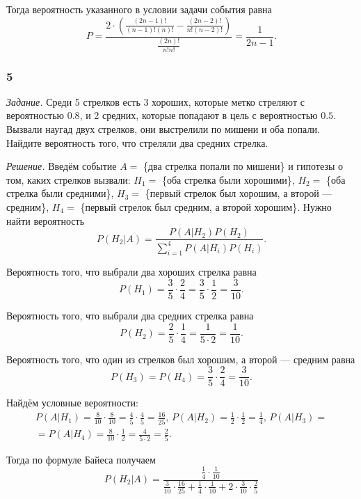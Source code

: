 Тогда вероятность указанного в условии задачи события равна
$$P =
\frac{2 \cdot \left( \frac{ \left( 2n-1 \right)!}{ \left( n-1 \right)! \left( n \right)!} -
\frac{ \left( 2n-2 \right)!}{n! \left( n-2 \right)!} \right) }{\frac{ \left( 2n \right)!}{n!n!}} =
\frac{1}{2n-1}.$$

\subsubsection*{5}

\textit{Задание.}
Среди 5 стрелков есть 3 хороших, которые метко стреляют с вероятностью $0.8$, и 2 средних, которые попадают в цель с вероятностью $0.5$.
Вызвали наугад двух стрелков, они выстрелили по мишени и оба попали.
Найдите вероятность того, что стреляли два средних стрелка.

\textit{Решение.}
Введём событие $A =$ \{два стрелка попали по мишени\} и гипотезы о том,
каких стрелков вызвали: $H_1 =$ \{оба стрелка были хорошими\},
$H_2 =$ \{оба стрелка были средними\}, $H_3 =$ \{первый стрелок был хорошим, а второй --- средним\}, $H_4 =$ \{первый стрелок был средним, а второй хорошим\}.
Нужно найти вероятность
$$P \left( \left. H_2 \right| A \right) =
\frac{P \left( \left. A \right| H_2 \right) P \left( H_2 \right) }{ \sum \limits_{i=1}^4 P \left( \left. A \right| H_i \right) P \left( H_i \right) }.$$

Вероятность того, что выбрали два хороших стрелка равна
$$P \left( H_1 \right) =
\frac{3}{5} \cdot \frac{2}{4} =
\frac{3}{5} \cdot \frac{1}{2} =
\frac{3}{10}.$$

Вероятность того, что выбрали два средних стрелка равна
$$P \left( H_2 \right) =
\frac{2}{5} \cdot \frac{1}{4} =
\frac{1}{5 \cdot 2} =
\frac{1}{10}.$$

Вероятность того, что один из стрелков был хорошим, а второй --- средним равна
$$P \left( H_3 \right) =
P \left( H_4 \right) =
\frac{3}{5} \cdot \frac{2}{4} =
\frac{3}{10}.$$

Найдём условные вероятности:
\begin{equation*}
\begin{split}
P \left( \left. A \right| H_1 \right) =
\frac{8}{10} \cdot \frac{8}{10} =
\frac{4}{5} \cdot \frac{4}{5} =
\frac{16}{25}, \,
P \left( \left. A \right| H_2 \right) =
\frac{1}{2} \cdot \frac{1}{2} =
\frac{1}{4}, \,
P \left( \left. A \right| H_3 \right) = \\
= P \left( \left. A \right| H_4 \right) =
\frac{8}{10} \cdot \frac{1}{2} =
\frac{4}{5 \cdot 2} =
\frac{2}{5}.
\end{split}
\end{equation*}

Тогда по формуле Байеса получаем
$$P \left( \left. H_2 \right| A \right) =
\frac{ \frac{1}{4} \cdot \frac{1}{10} }{ \frac{3}{10} \cdot \frac{16}{25} + \frac{1}{4} \cdot \frac{1}{10} + 2 \cdot \frac{3}{10} \cdot \frac{2}{5} }$$

